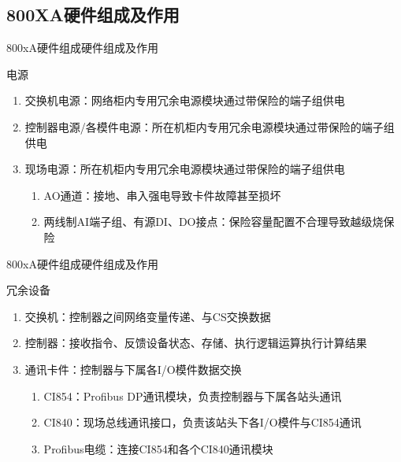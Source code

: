 \documentclass[12pt,hyperref={CJKbookmarks=true}]{beamer} %
\begin{document}
\subsection{800XA硬件组成及作用}
\begin{frame}{800xA硬件组成}{硬件组成及作用}
\begin{block}{电源}
			\begin{enumerate}
				\item  交换机电源：网络柜内专用冗余电源模块通过带保险的端子组供电
				
				\item  控制器电源/各模件电源：所在机柜内专用冗余电源模块通过带保险的端子组供电
				
				\item 现场电源：所在机柜内专用冗余电源模块通过带保险的端子组供电
\pause
\begin{enumerate}
\item AO通道：接地、串入强电导致卡件故障甚至损坏
\item 两线制AI端子组、有源DI、DO接点：保险容量配置不合理导致越级烧保险
\end{enumerate}
			\end{enumerate}
		\end{block}

\end{frame}
\begin{frame}{800xA硬件组成}{硬件组成及作用}

\begin{exampleblock}{冗余设备}
			\begin{enumerate}
				\item  交换机：控制器之间网络变量传递、与CS交换数据
				
				\item  控制器：接收指令、反馈设备状态、存储、执行逻辑运算执行计算结果
				
				\item  通讯卡件：控制器与下属各I/O模件数据交换
\pause
\begin{enumerate}
				\item  CI854：Profibus DP通讯模块，负责控制器与下属各站头通讯
				
				\item  CI840：现场总线通讯接口，负责该站头下各I/O模件与CI854通讯
\item  Profibus电缆：连接CI854和各个CI840通讯模块
				

			\end{enumerate}
			\end{enumerate}
		\end{exampleblock}
		
\end{frame}
\end{document}
